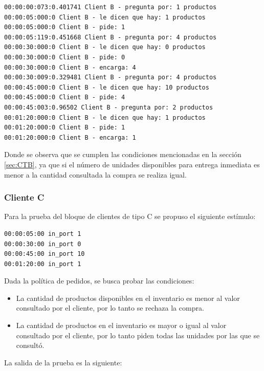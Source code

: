 \documentclass[10pt]{article}
\begin{document}
\begin{minipage}{1\textwidth}
	\centering
	\begin{lstlisting}
00:00:00:073:0.401741 Client B - pregunta por: 1 productos
00:00:05:000:0 Client B - le dicen que hay: 1 productos
00:00:05:000:0 Client B - pide: 1
00:00:05:119:0.451668 Client B - pregunta por: 4 productos
00:00:30:000:0 Client B - le dicen que hay: 0 productos
00:00:30:000:0 Client B - pide: 0
00:00:30:000:0 Client B - encarga: 4
00:00:30:009:0.329481 Client B - pregunta por: 4 productos
00:00:45:000:0 Client B - le dicen que hay: 10 productos
00:00:45:000:0 Client B - pide: 4
00:00:45:003:0.96502 Client B - pregunta por: 2 productos
00:01:20:000:0 Client B - le dicen que hay: 1 productos
00:01:20:000:0 Client B - pide: 1
00:01:20:000:0 Client B - encarga: 1
	\end{lstlisting}
	
\end{minipage}
Donde se observa que se cumplen las condiciones mencionadas en la sección \ref{sec:CTB}, ya que si el número de unidades disponibles para entrega inmediata es menor a la cantidad consultada la compra se realiza igual.

\subsubsection{Cliente C}
Para la prueba del bloque de clientes de tipo C se propuso el siguiente estímulo:

\begin{minipage}{1\textwidth}
	\centering
	\begin{lstlisting}
00:00:05:00 in_port 1
00:00:30:00 in_port 0
00:00:45:00 in_port 10
00:01:20:00 in_port 1
	\end{lstlisting}
\end{minipage}

Dada la política de pedidos, se busca probar las condiciones:
\begin{itemize}
\item La cantidad de productos disponibles en el inventario es menor al valor consultado por el cliente, por lo tanto se rechaza la compra.
\item La cantidad de productos en el inventario es mayor o igual al valor consultado por el cliente, por lo tanto piden todas las unidades por las que se consultó.
\end{itemize}

La salida de la prueba es la siguiente:
\end{document}
